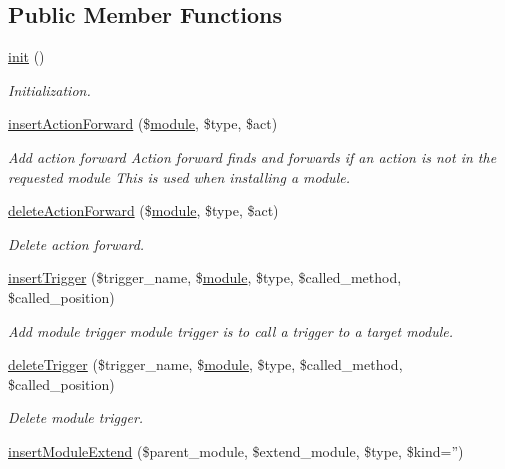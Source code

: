 \subsection*{Public Member Functions}
\begin{DoxyCompactItemize}
\item 
\hyperlink{classmoduleController_a589d3d74f4601ae495a33d001ad8ffa0}{init} ()
\begin{DoxyCompactList}\small\item\em Initialization. \end{DoxyCompactList}\item 
\hyperlink{classmoduleController_a9a5ff2def7412c659594c62a4615a0cd}{insert\+Action\+Forward} (\$\hyperlink{classmodule}{module}, \$type, \$act)
\begin{DoxyCompactList}\small\item\em Add action forward Action forward finds and forwards if an action is not in the requested module This is used when installing a module. \end{DoxyCompactList}\item 
\hyperlink{classmoduleController_ad256622e3b12acb2d96997315dc6fc45}{delete\+Action\+Forward} (\$\hyperlink{classmodule}{module}, \$type, \$act)
\begin{DoxyCompactList}\small\item\em Delete action forward. \end{DoxyCompactList}\item 
\hyperlink{classmoduleController_ad4fb0e3cfddb064ffcc9d71f983066a9}{insert\+Trigger} (\$trigger\+\_\+name, \$\hyperlink{classmodule}{module}, \$type, \$called\+\_\+method, \$called\+\_\+position)
\begin{DoxyCompactList}\small\item\em Add module trigger module trigger is to call a trigger to a target module. \end{DoxyCompactList}\item 
\hyperlink{classmoduleController_a60dbf5d358cddb566b3d3e297a003d23}{delete\+Trigger} (\$trigger\+\_\+name, \$\hyperlink{classmodule}{module}, \$type, \$called\+\_\+method, \$called\+\_\+position)
\begin{DoxyCompactList}\small\item\em Delete module trigger. \end{DoxyCompactList}\item 
\hyperlink{classmoduleController_a74076ed057c3d3671a364fa478aa1109}{insert\+Module\+Extend} (\$parent\+\_\+module, \$extend\+\_\+module, \$type, \$kind='')

\end{DoxyCompactItemize}
